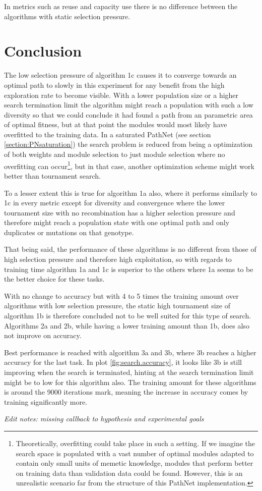 In metrics such as reuse and capacity use there is no difference between the algorithms with static selection pressure. 

\section{Conclusion}

The low selection pressure of algorithm 1c causes it to converge towards an optimal path to slowly in this experiment for any benefit from the high exploration rate to become visible. With a lower population size or a higher search termination limit the algorithm might reach a population with such a low diversity so that we could conclude it had found a path from an parametric area of optimal fitness, but at that point the modules would most likely have overfitted to the training data. In a saturated PathNet (see section \ref{section:PNsaturation}) the search problem is reduced from being a optimization of both weights and module selection to just module selection where no overfitting can occur\footnote{Theoretically, overfitting could take place in such a setting. If we imagine the search space is populated with a vast number of optimal modules adapted to contain only small units of memetic knowledge, modules that perform better on training data than validation data could be found. However, this is an unrealistic scenario far from the structure of this PathNet implementation.}, but in that case, another optimization scheme might work better than tournament search. 

To a lesser extent this is true for algorithm 1a also, where it performs similarly to 1c in every metric except for diversity and convergence where the lower tournament size with no recombination has a higher selection pressure and therefore might reach a population state with one optimal path and only duplicates or mutations on that genotype.  

That being said, the performance of these algorithms is no different from those of high selection pressure and therefore high exploitation, so with regards to training time algorithm 1a and 1c is superior to the others where 1a seems to be the better choice for these tasks. 

With no change to accuracy but with 4 to 5 times the training amount over algorithms with low selection pressure, the static high tournament size of algorithm 1b is therefore concluded not to be well suited for this type of search. Algorithms 2a and 2b, while having a lower training amount than 1b, does also not improve on accuracy. 

Best performance is reached with algorithm 3a and 3b, where 3b reaches a higher accuracy for the last task. In plot \ref{fig:search.accuracy}, it looks like 3b is still improving when the search is terminated, hinting at the search termination limit might be to low for this algorithm also. The training amount for these algorithms is around the 9000 iterations mark, meaning the increase in accuracy comes by training significantly more. 



\textit{Edit notes: missing callback to hypothesis and experimental goals}